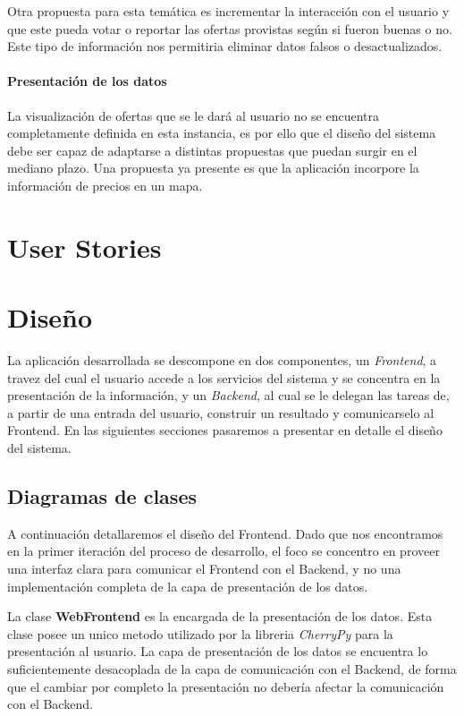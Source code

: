 \documentclass[10pt, a4paper]{article}
\begin{document}
Otra propuesta para esta temática es incrementar la interacción con el usuario y que este pueda votar o reportar las ofertas provistas según si fueron buenas o no. Este tipo de información nos permitiria eliminar datos falsos o desactualizados.

\paragraph{Presentación de los datos}
La visualización de ofertas que se le dará al usuario no se encuentra completamente definida en esta instancia, es por ello que el diseño del sistema debe ser capaz de adaptarse a distintas propuestas que puedan surgir en el mediano plazo. Una propuesta ya presente es que la aplicación incorpore la información de precios en un mapa.


\section{User Stories}



\section{Diseño}

La aplicación desarrollada se descompone en dos componentes, un \emph{Frontend}, a travez del cual el usuario accede a los servicios del sistema y se concentra en la presentación de la información, y un \emph{Backend}, al cual se le delegan las tareas de, a partir de una entrada del usuario, construir un resultado y comunicarselo al Frontend. En las siguientes secciones pasaremos a presentar en detalle el diseño del sistema.

\subsection{Diagramas de clases}
  
A continuación detallaremos el diseño del Frontend. Dado que nos encontramos en la primer iteración del proceso de desarrollo, el foco se concentro en proveer una interfaz clara para comunicar el Frontend con el Backend, y no una implementación completa de la capa de presentación de los datos.

La clase \textbf{WebFrontend} es la encargada de la presentación de los datos. Esta clase posee un unico metodo utilizado por la libreria \emph{CherryPy} para la presentación  al usuario. La capa de presentación de los datos se encuentra lo suficientemente desacoplada de la capa de comunicación con el Backend, de forma que el cambiar por completo la presentación no debería afectar la comunicación con el Backend.
\end{document}
